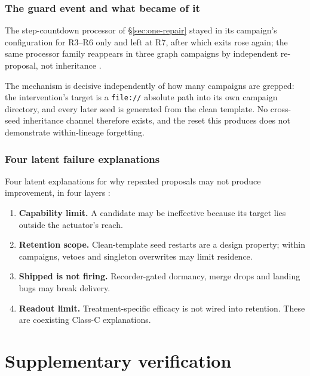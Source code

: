 \subsubsection*{The guard event and what became of it}

The step-countdown processor of \S\ref{sec:one-repair} stayed in its
campaign's configuration for R3--R6 only and left at R7, after which exits
rose again; the same processor family reappears in three graph campaigns
by independent re-proposal, not inheritance .

The mechanism is decisive independently of how many campaigns are grepped:
the intervention's target is a \texttt{file://} absolute path into its own
campaign directory, and every later seed is generated from the clean
template. No cross-seed inheritance channel therefore exists, and the
reset this produces does not demonstrate within-lineage forgetting.

\subsubsection*{Four latent failure explanations} 

Four latent explanations for why repeated proposals may not produce improvement, in four
layers :

\begin{enumerate}
  \item \textbf{Capability limit.} A candidate may be ineffective because
        its target lies outside the actuator's reach.
  \item \textbf{Retention scope.} Clean-template seed restarts are a
        design property; within campaigns, vetoes and singleton overwrites
        may limit residence.
  \item \textbf{Shipped is not firing.} Recorder-gated dormancy, merge
        drops and landing bugs may break delivery.
  \item \textbf{Readout limit.} Treatment-specific efficacy is not wired
        into retention. These are coexisting Class-C explanations.
\end{enumerate}

\section{Supplementary verification}

